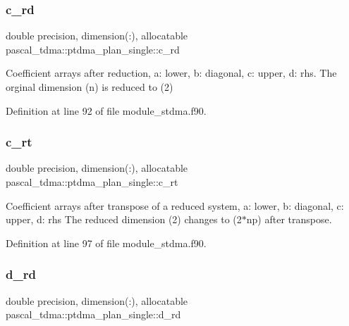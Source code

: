 \subsubsection{\texorpdfstring{c\_rd}{c\_rd}}
{\footnotesize\ttfamily double precision, dimension(\+:), allocatable pascal\+\_\+tdma\+::ptdma\+\_\+plan\+\_\+single\+::c\+\_\+rd}



Coefficient arrays after reduction, a\+: lower, b\+: diagonal, c\+: upper, d\+: rhs. The orginal dimension (n) is reduced to (2) 



Definition at line 92 of file module\+\_\+stdma.\+f90.

\mbox{\label{structpascal__tdma_1_1ptdma__plan__single_a7169b89281236696ea6eb5631ce44d95}} 
\subsubsection{\texorpdfstring{c\_rt}{c\_rt}}
{\footnotesize\ttfamily double precision, dimension(\+:), allocatable pascal\+\_\+tdma\+::ptdma\+\_\+plan\+\_\+single\+::c\+\_\+rt}



Coefficient arrays after transpose of a reduced system, a\+: lower, b\+: diagonal, c\+: upper, d\+: rhs The reduced dimension (2) changes to (2$\ast$np) after transpose. 



Definition at line 97 of file module\+\_\+stdma.\+f90.

\mbox{\label{structpascal__tdma_1_1ptdma__plan__single_a8b99edaa7ecd71fe6ceafd9c69d9a374}} 
\subsubsection{\texorpdfstring{d\_rd}{d\_rd}}
{\footnotesize\ttfamily double precision, dimension(\+:), allocatable pascal\+\_\+tdma\+::ptdma\+\_\+plan\+\_\+single\+::d\+\_\+rd}



